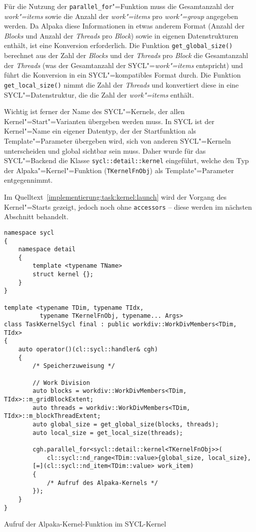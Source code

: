 Für die Nutzung der \texttt{parallel\_for}"=Funktion muss die Gesamtanzahl der
\textit{work"=items} sowie die Anzahl der \textit{work"=items} pro
\textit{work"=group} angegeben werden. Da Alpaka diese Informationen in etwas
anderem Format (Anzahl der \textit{Blocks} und Anzahl der \textit{Threads} pro
\textit{Block}) sowie in eigenen Datenstrukturen enthält, ist eine Konversion
erforderlich. Die Funktion \texttt{get\_global\_size()} berechnet aus der Zahl
der \textit{Blocks} und der \textit{Threads} pro \textit{Block} die Gesamtanzahl
der \textit{Threads} (was der Gesamtanzahl der SYCL"=\textit{work"=items}
entspricht) und führt die Konversion in ein SYCL"=kompatibles Format durch. Die
Funktion \texttt{get\_local\_size()} nimmt die Zahl der \textit{Threads} und
konvertiert diese in eine SYCL"=Datenstruktur, die die Zahl der
\textit{work"=items} enthält.

Wichtig ist ferner der Name des SYCL"=Kernels, der allen
Kernel"=Start"=Varianten übergeben werden muss. In SYCL ist der Kernel"=Name ein
eigener Datentyp, der der Startfunktion als Template"=Parameter übergeben wird,
sich von anderen SYCL"=Kerneln unterscheiden und global sichtbar sein muss.
Daher wurde für das SYCL"=Backend die Klasse \texttt{sycl::detail::kernel}
eingeführt, welche den Typ der Alpaka"=Kernel"=Funktion (\texttt{TKernelFnObj})
als Template"=Parameter entgegennimmt.

Im Quelltext~\ref{implementierung:task:kernel:launch} wird der Vorgang des
Kernel"=Starts gezeigt, jedoch noch ohne \texttt{accessors} -- diese werden
im nächsten Abschnitt behandelt.

\begin{code}
    \begin{verbatim}
namespace sycl
{
    namespace detail
    {
        template <typename TName>
        struct kernel {};
    }
}

template <typename TDim, typename TIdx,
          typename TKernelFnObj, typename... Args>
class TaskKernelSycl final : public workdiv::WorkDivMembers<TDim, TIdx>
{
    auto operator()(cl::sycl::handler& cgh)
    {
        /* Speicherzuweisung */

        // Work Division
        auto blocks = workdiv::WorkDivMembers<TDim, TIdx>::m_gridBlockExtent;
        auto threads = workdiv::WorkDivMembers<TDim, TIdx>::m_blockThreadExtent;
        auto global_size = get_global_size(blocks, threads);
        auto local_size = get_local_size(threads);

        cgh.parallel_for<sycl::detail::kernel<TKernelFnObj>>(
            cl::sycl::nd_range<TDim::value>{global_size, local_size},
        [=](cl::sycl::nd_item<TDim::value> work_item)
        {
            /* Aufruf des Alpaka-Kernels */
        });
    }
}
    \end{verbatim}
    \caption{Aufruf der Alpaka-Kernel-Funktion im SYCL-Kernel}
    \label{implementierung:task:kernel:launch}
\end{code}

